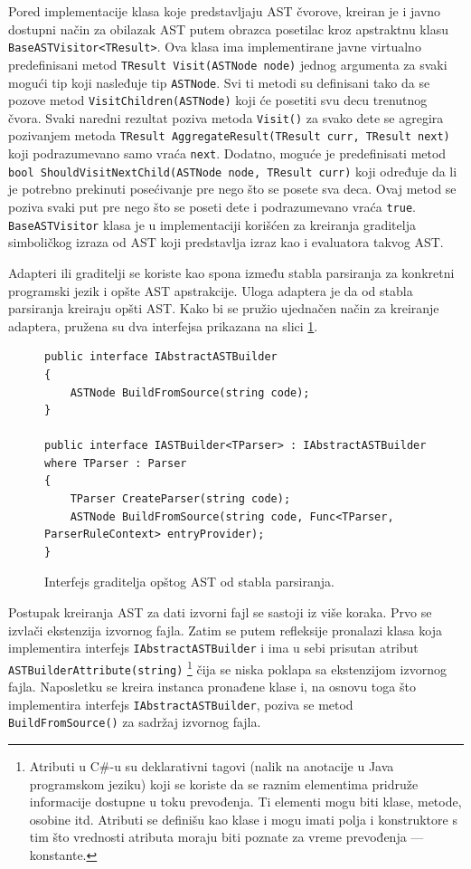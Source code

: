 Pored implementacije klasa koje predstavljaju AST čvorove, kreiran je i javno dostupni način za obilazak AST putem obrazca posetilac kroz apstraktnu klasu \texttt{BaseASTVisitor<TResult>}. Ova klasa ima implementirane javne virtualno predefinisani metod \texttt{TResult Visit(ASTNode node)} jednog argumenta za svaki mogući tip koji nasleđuje tip \texttt{ASTNode}. Svi ti metodi su definisani tako da se pozove metod \texttt{VisitChildren(ASTNode)} koji će posetiti svu decu trenutnog čvora. Svaki naredni rezultat poziva metoda \texttt{Visit()} za svako dete se agregira pozivanjem metoda \texttt{TResult AggregateResult(TResult curr, TResult next)} koji podrazumevano samo vraća \texttt{next}. Dodatno, moguće je predefinisati metod \texttt{bool ShouldVisitNextChild(ASTNode node, TResult curr)} koji određuje da li je potrebno prekinuti posećivanje pre nego što se posete sva deca. Ovaj metod se poziva svaki put pre nego što se poseti dete i podrazumevano vraća \texttt{true}. \texttt{BaseASTVisitor} klasa je u implementaciji korišćen za kreiranja graditelja simboličkog izraza od AST koji predstavlja izraz kao i evaluatora takvog AST. 

Adapteri ili graditelji se koriste kao spona između stabla parsiranja za konkretni programski jezik i opšte AST apstrakcije. Uloga adaptera je da od stabla parsiranja kreiraju opšti AST. Kako bi se pružio ujednačen način za kreiranje adaptera, pružena su dva interfejsa prikazana na slici \ref{fig:ImplBuilderInterface}.

\begin{figure}[h!]
\centering
\begin{lstlisting}
public interface IAbstractASTBuilder
{
    ASTNode BuildFromSource(string code);
}

public interface IASTBuilder<TParser> : IAbstractASTBuilder where TParser : Parser
{
    TParser CreateParser(string code);
    ASTNode BuildFromSource(string code, Func<TParser, ParserRuleContext> entryProvider);
}
\end{lstlisting}
\caption{Interfejs graditelja opštog AST od stabla parsiranja.}
\label{fig:ImplBuilderInterface}
\end{figure}

Postupak kreiranja AST za dati izvorni fajl se sastoji iz više koraka. Prvo se izvlači ekstenzija izvornog fajla. Zatim se putem refleksije pronalazi klasa koja implementira interfejs \texttt{IAbstractASTBuilder} i ima u sebi prisutan atribut \texttt{ASTBuilderAttribute(string)} \footnote{Atributi u C\#-u su deklarativni tagovi (nalik na anotacije u Java programskom jeziku) koji se koriste da se raznim elementima pridruže informacije dostupne u toku prevođenja. Ti elementi mogu biti klase, metode, osobine itd. Atributi se definišu kao klase i mogu imati polja i konstruktore s tim što vrednosti atributa moraju biti poznate za vreme prevođenja --- konstante.}
čija se niska poklapa sa ekstenzijom izvornog fajla. Naposletku se kreira instanca pronađene klase i, na osnovu toga što implementira interfejs \texttt{IAbstractASTBuilder}, poziva se metod \texttt{BuildFromSource()} za sadržaj izvornog fajla.

